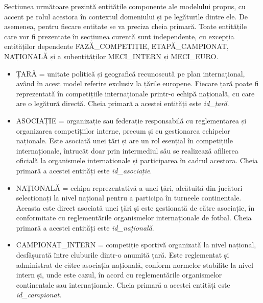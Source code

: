 \documentclass{article}
\begin{document}
	\vspace{0.5cm}
		
	Secțiunea următoare prezintă entitățile componente ale modelului propus, cu accent pe rolul acestora în contextul domeniului și pe legăturile dintre ele. De asemenea, pentru fiecare entitate se va preciza cheia primară. Toate entitățile care vor fi prezentate în secțiunea curentă sunt independente, cu excepția entităților dependente FAZĂ\_COMPETIȚIE, ETAPĂ\_CAMPIONAT, NAȚIONALĂ și a subentităților MECI\_INTERN și MECI\_EURO.
	
	\vspace{0.3cm}
	
	\begin{itemize}
	
	\item ȚARĂ = unitate politică și geografică recunoscută pe plan internațional, având în acest model referire exclusiv la țările europene. Fiecare țară poate fi reprezentată în competițiile internaționale printr-o echipă națională, cu care are o legătură directă. Cheia primară a acestei entități este \textit{id\_țară}.
	 
	\item ASOCIAȚIE = organizație sau federație responsabilă cu reglementarea și organizarea competițiilor interne, precum și cu gestionarea echipelor naționale. Este asociată unei țări și are un rol esențial în competițiile internaționale, întrucât doar prin intermediul său se realizează afilierea oficială la organismele internaționale și participarea în cadrul acestora. Cheia primară a acestei entități este \textit{id\_asociație}.
	
	\item NAȚIONALĂ = echipa reprezentativă a unei țări, alcătuită din jucători selecționați la nivel național pentru a participa în turneele continentale. Aceasta este direct asociată unei țări și este gestionată de către asociație, în conformitate cu reglementările organismelor internaționale de fotbal. Cheia primară a acestei entități este \textit{id\_națională}.
	
	\item CAMPIONAT\_INTERN = competiție sportivă organizată la nivel național, desfășurată între cluburile dintr-o anumită țară. Este reglementat și administrat de către asociația națională, conform normelor stabilite la nivel intern și, unde este cazul, în acord cu reglementările organismelor continentale sau internaționale. Cheia primară a acestei entități este \textit{id\_campionat}.


\end{itemize}
\end{document}
